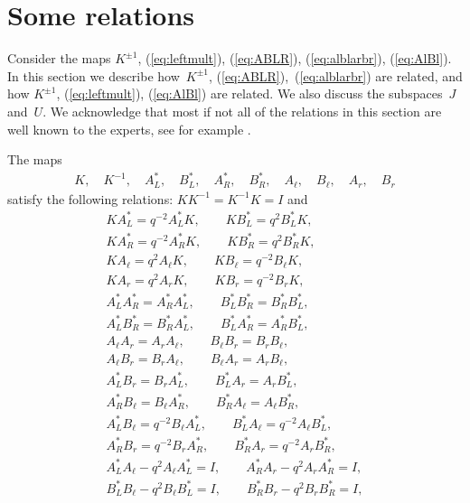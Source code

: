 \section{Some relations}\label{section9}

Consider the maps $K^{\pm 1}$, (\ref{eq:leftmult}), (\ref{eq:ABLR}), (\ref{eq:alblarbr}), (\ref{eq:AlBl}). In this section we describe how~$K^{\pm 1}$, (\ref{eq:ABLR}),~(\ref{eq:alblarbr}) are related, and how $K^{\pm 1}$, (\ref{eq:leftmult}), (\ref{eq:AlBl}) are related. We also discuss the subspaces~$J$ and~$U$.
We acknowledge that most if not all of the relations in this section are well known to the experts, see for example
\cite[Sections~3.3 and 3.4]{kashiwara}.
\begin{Proposition}\label{thm:v1} The maps
\begin{gather}\label{eq:maplist1}
K, \quad K^{-1},\quad A^*_L,
\quad
B^*_L,
\quad
A^*_R,
\quad
B^*_R,
\quad
A_\ell,
\quad
B_\ell,
\quad
A_r,
\quad
B_r
\end{gather}
satisfy the following relations: $K K^{-1} = K^{-1}K = I$ and
\begin{gather*}
K A^*_L = q^{-2} A^*_L K,\qquad K B^*_L = q^2 B^*_L K,\\
K A^*_R = q^{-2} A^*_R K,\qquad K B^*_R = q^{2} B^*_R K,\\
K A_\ell = q^{2} A_\ell K,\qquad K B_\ell = q^{-2} B_\ell K,\\
K A_r = q^{2} A_r K,\qquad K B_r = q^{-2} B_r K,\\
A^*_L A^*_R = A^*_R A^*_L, \qquad B^*_L B^*_R = B^*_R B^*_L,\\
A^*_L B^*_R = B^*_R A^*_L, \qquad B^*_L A^*_R = A^*_R B^*_L,\\
A_\ell A_r = A_r A_\ell, \qquad B_\ell B_r = B_r B_\ell,\\
A_\ell B_r = B_r A_\ell, \qquad B_\ell A_r = A_r B_\ell,\\
A^*_L B_r = B_r A^*_L, \qquad B^*_L A_r = A_r B^*_L,\\
 A^*_R B_\ell = B_\ell A^*_R, \qquad B^*_R A_\ell = A_\ell B^*_R,\\
A^*_L B_\ell = q^{-2} B_\ell A^*_L, \qquad B^*_L A_\ell = q^{-2} A_\ell B^*_L,\\
A^*_R B_r = q^{-2} B_r A^*_R, \qquad B^*_R A_r = q^{-2} A_r B^*_R,\\
 A^*_L A_\ell - q^2 A_{\ell} A^*_L = I, \qquad A^*_R A_r - q^2 A_r A^*_R = I,\\
 B^*_L B_\ell - q^2 B_{\ell} B^*_L = I,\qquad B^*_R B_r - q^2 B_r B^*_R = I,\\

\end{gather*}
\end{Proposition}
